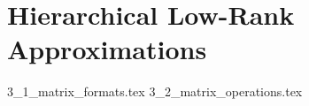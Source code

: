 \chapter{Hierarchical Low-Rank Approximations}
\label{chap:hierarchical_matrices}

{3_1_matrix_formats.tex}
{3_2_matrix_operations.tex}
